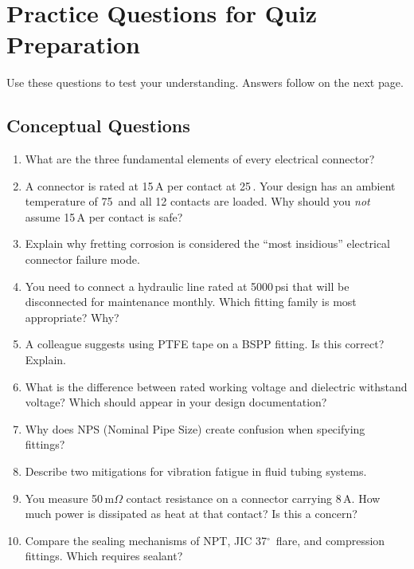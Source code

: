 \section{Practice Questions for Quiz Preparation}

Use these questions to test your understanding. Answers follow on the next page.

\subsection{Conceptual Questions}

\begin{enumerate}[leftmargin=1.5em]
  \item What are the three fundamental elements of every electrical connector?

  \item A connector is rated at 15\,A per contact at 25\,\degC{}. Your design has an ambient temperature of 75\,\degC{} and all 12 contacts are loaded. Why should you \emph{not} assume 15\,A per contact is safe?

  \item Explain why fretting corrosion is considered the ``most insidious'' electrical connector failure mode.

  \item You need to connect a hydraulic line rated at 5000\,psi that will be disconnected for maintenance monthly. Which fitting family is most appropriate? Why?

  \item A colleague suggests using PTFE tape on a BSPP fitting. Is this correct? Explain.

  \item What is the difference between rated working voltage and dielectric withstand voltage? Which should appear in your design documentation?

  \item Why does NPS (Nominal Pipe Size) create confusion when specifying fittings?

  \item Describe two mitigations for vibration fatigue in fluid tubing systems.

  \item You measure 50\,m$\Omega$ contact resistance on a connector carrying 8\,A. How much power is dissipated as heat at that contact? Is this a concern?

  \item Compare the sealing mechanisms of NPT, JIC 37$^{\circ}$\ flare, and compression fittings. Which requires sealant?
\end{enumerate}

